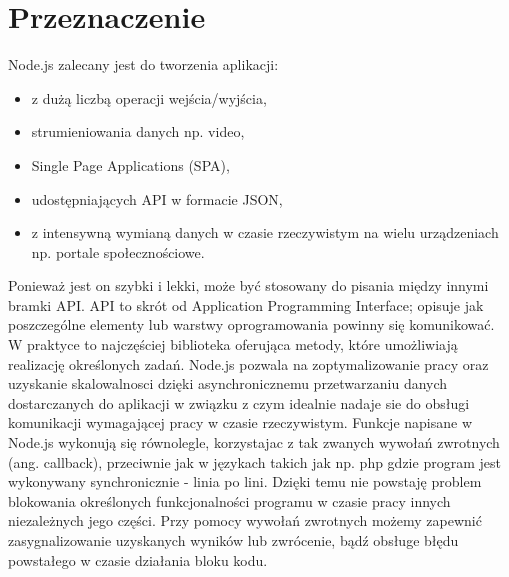 \documentclass[12pt]{report}
\begin{document}
\section{Przeznaczenie}
Node.js zalecany jest do tworzenia aplikacji: 
\begin{itemize}
\item z dużą liczbą operacji wejścia/wyjścia,
\item strumieniowania danych np. video, 
\item Single Page Applications (SPA),
\item udostępniających API w formacie JSON,
\item z intensywną wymianą danych w czasie rzeczywistym na wielu urządzeniach np. portale społecznościowe.
\end{itemize} 
Ponieważ jest on szybki i lekki, może być stosowany do pisania między innymi bramki API. 
API to skrót od Application Programming Interface; opisuje jak poszczególne elementy lub warstwy oprogramowania powinny się komunikować. 
W praktyce to najczęściej biblioteka oferująca metody, które umożliwiają realizację określonych zadań. 
Node.js pozwala na zoptymalizowanie pracy oraz uzyskanie skalowalnosci dzięki asynchronicznemu przetwarzaniu danych dostarczanych do aplikacji w związku z czym idealnie nadaje sie do obsługi komunikacji wymagającej pracy w czasie rzeczywistym. 
Funkcje napisane w Node.js wykonują się równolegle, korzystajac z tak zwanych wywołań zwrotnych (ang. callback), przeciwnie jak w językach takich jak np. php gdzie program jest wykonywany synchronicznie - linia po lini. 
Dzięki temu nie powstaję problem blokowania określonych funkcjonalności programu w czasie pracy innych niezależnych jego części. 
Przy pomocy wywołań zwrotnych możemy zapewnić zasygnalizowanie uzyskanych wyników lub zwrócenie, bądź obsługe błędu powstałego w czasie działania bloku kodu.
\end{document}
